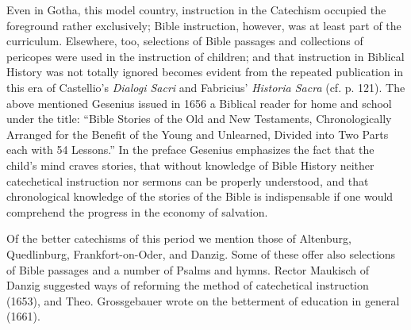 Even in Gotha, this model country, instruction in the Catechism occupied the foreground rather exclusively; Bible instruction, however, was at least part of the curriculum. Elsewhere, too, selections of Bible passages and collections of pericopes were used in the instruction of children; and that instruction in Biblical History was not totally ignored becomes evident from the repeated publication in this era of Castellio’s \emph{Dialogi Sacri} and Fabricius’ \emph{Historia Sacra} (cf. p. 121). The above mentioned Gesenius issued in 1656 a Biblical reader for home and school under the title: “Bible Stories of the Old and New Testaments, Chronologically Arranged for the Benefit of the Young and Unlearned, Divided into Two Parts each with 54 Lessons.” In the preface Gesenius emphasizes the fact that the child’s mind craves stories, that without knowledge of Bible History neither catechetical instruction nor sermons can be properly understood, and that chronological knowledge of the stories of the Bible is indispensable if one would comprehend the progress in the economy of salvation.

Of the better catechisms of this period we mention those of Altenburg, Quedlinburg, Frankfort-on-Oder, and Danzig. Some of these offer also selections of Bible passages and a number of Psalms and hymns. Rector Maukisch of Danzig suggested ways of reforming the method of catechetical instruction (1653), and Theo. Grossgebauer wrote on the betterment of education in general (1661).
